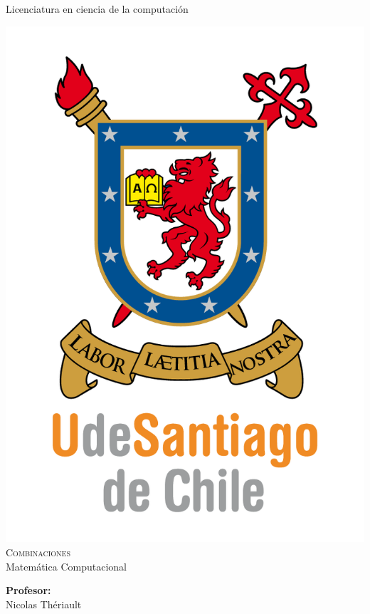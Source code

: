 \documentclass[12pt,letterpaper]{scrartcl}
\author{Don cuyi}
\begin{document}
\begin{titlepage}

\begin{center}

{\Large { Licenciatura en ciencia de la computación} }

\includegraphics[scale=1]{UDSCNRJ}
\\[1cm]

{\Huge \textsc{Combinaciones}}\\[0.7cm]

{\huge  Matemática Computacional}\\[2cm]


\begin{minipage}[l]{0.4\textwidth}
	\begin{flushleft}
	\linespread{1}
		\textbf{\textsf{Profesor:}}\\
		\large Nicolas Thériault
	\end{flushleft}
\end{minipage}
\begin{minipage}[l]{0.4\textwidth}


\end{minipage}
\end{center}
\end{titlepage}
\end{document}
